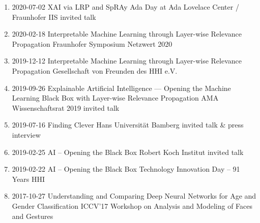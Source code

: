 \documentclass[10pt,a4paper]{article} %
\begin{document}
{\begin{enumerate}
    \item {}
                    {2020-07-02}
                    {XAI via LRP and SpRAy}
                    {Ada Day at Ada Lovelace Center / Fraunhofer IIS}
                    {invited talk}
    \item {}
                    {2020-02-18}
                    {Interpretable Machine Learning through Layer-wise Relevance Propagation}
                    {Fraunhofer Symposium Netzwert 2020}
    \item {}
                    {2019-12-12}
                    {Interpretable Machine Learning through Layer-wise Relevance Propagation}
                    {Gesellschaft von Freunden des HHI e.V.}
    \item {}
                    {2019-09-26}
                    {Explainable Artificial Intelligence --- Opening the Machine Learning Black Box with Layer-wise Relevance Propagation}
                    {AMA Wissenschaftsrat 2019}
                    {invited talk}
    \item {}
                    {2019-07-16}
                    {Finding Clever Hans}
                    {Universität Bamberg}
                    {invited talk \& press interview}
    \item {}
                    {2019-02-25}
                    {AI -- Opening the Black Box}
                    {Robert Koch Institut}
                    {invited talk}
    \item {}
                    {2019-02-22}
                    {AI -- Opening the Black Box}
                    {Technology Innovation Day -- 91 Years HHI}
    \item {}
                    {2017-10-27}
                    {Understanding and Comparing Deep Neural Networks for Age and Gender Classification}
                    {ICCV'17 Workshop on Analysis and Modeling of Faces and Gestures}
\end{enumerate}
}
\end{document}
